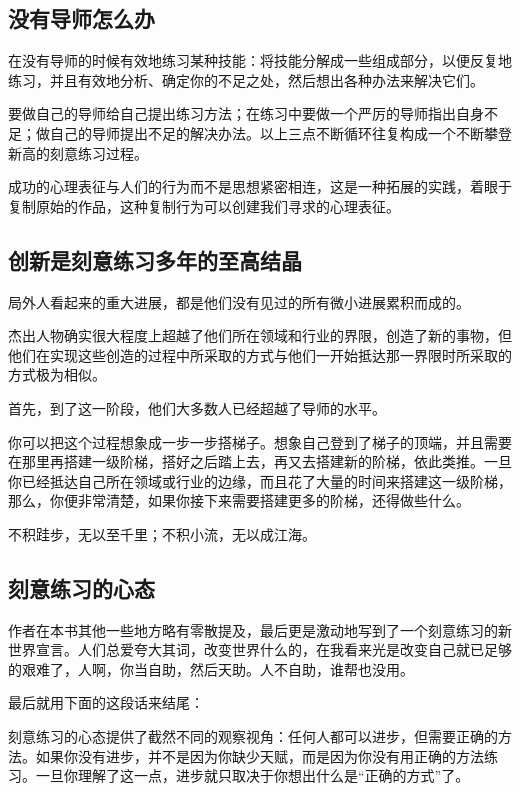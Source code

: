 \documentclass[12pt,oneside]{book}
\begin{document}
\subsection{没有导师怎么办}
\begin{bookref}[frametitle={\cite{刻意练习}}]
在没有导师的时候有效地练习某种技能：将技能分解成一些组成部分，以便反复地练习，并且有效地分析、确定你的不足之处，然后想出各种办法来解决它们。
\end{bookref}

要做自己的导师给自己提出练习方法；在练习中要做一个严厉的导师指出自身不足；做自己的导师提出不足的解决办法。以上三点不断循环往复构成一个不断攀登新高的刻意练习过程。

成功的心理表征与人们的行为而不是思想紧密相连，这是一种拓展的实践，着眼于复制原始的作品，这种复制行为可以创建我们寻求的心理表征。

\subsection{创新是刻意练习多年的至高结晶}
\begin{bookref}[frametitle={\cite{刻意练习}}]
局外人看起来的重大进展，都是他们没有见过的所有微小进展累积而成的。

杰出人物确实很大程度上超越了他们所在领域和行业的界限，创造了新的事物，但他们在实现这些创造的过程中所采取的方式与他们一开始抵达那一界限时所采取的方式极为相似。

首先，到了这一阶段，他们大多数人已经超越了导师的水平。

你可以把这个过程想象成一步一步搭梯子。想象自己登到了梯子的顶端，并且需要在那里再搭建一级阶梯，搭好之后踏上去，再又去搭建新的阶梯，依此类推。一旦你已经抵达自己所在领域或行业的边缘，而且花了大量的时间来搭建这一级阶梯，那么，你便非常清楚，如果你接下来需要搭建更多的阶梯，还得做些什么。

不积跬步，无以至千里；不积小流，无以成江海。
\end{bookref}

\subsection{刻意练习的心态}
作者在本书其他一些地方略有零散提及，最后更是激动地写到了一个刻意练习的新世界宣言。人们总爱夸大其词，改变世界什么的，在我看来光是改变自己就已足够的艰难了，人啊，你当自助，然后天助。人不自助，谁帮也没用。

最后就用下面的这段话来结尾：

\begin{bookref}[frametitle={\cite{刻意练习}}]
刻意练习的心态提供了截然不同的观察视角：任何人都可以进步，但需要正确的方法。如果你没有进步，并不是因为你缺少天赋，而是因为你没有用正确的方法练习。一旦你理解了这一点，进步就只取决于你想出什么是“正确的方式”了。
\end{bookref}
\end{document}
